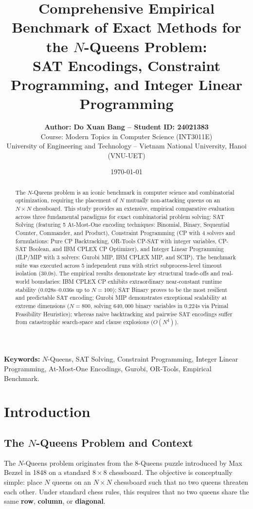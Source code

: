 \documentclass[a4paper,11pt]{article}
\title{\textbf{\LARGE Comprehensive Empirical Benchmark of Exact Methods for the $N$-Queens Problem: \\ SAT Encodings, Constraint Programming, and Integer Linear Programming}}
\author{
    \textbf{Author: Do Xuan Bang -- Student ID: 24021383}\\
    Course: Modern Topics in Computer Science (INT3011E) \\
    University of Engineering and Technology -- Vietnam National University, Hanoi (VNU-UET)
}
\date{\today}
\begin{document}
\maketitle

\begin{abstract}
\noindent The $N$-Queens problem is an iconic benchmark in computer science and combinatorial optimization, requiring the placement of $N$ mutually non-attacking queens on an $N \times N$ chessboard. This study provides an extensive, empirical comparative evaluation across three fundamental paradigms for exact combinatorial problem solving: SAT Solving (featuring 5 At-Most-One encoding techniques: Binomial, Binary, Sequential Counter, Commander, and Product), Constraint Programming (CP with 4 solvers and formulations: Pure CP Backtracking, OR-Tools CP-SAT with integer variables, CP-SAT Boolean, and IBM CPLEX CP Optimizer), and Integer Linear Programming (ILP/MIP with 3 solvers: Gurobi MIP, IBM CPLEX MIP, and SCIP). The benchmark suite was executed across 5 independent runs with strict subprocess-level timeout isolation (30.0s). The empirical results demonstrate key structural trade-offs and real-world boundaries: IBM CPLEX CP exhibits extraordinary near-constant runtime stability ($0.028$s--$0.036$s up to $N=100$); SAT Binary proves to be the most resilient and predictable SAT encoding; Gurobi MIP demonstrates exceptional scalability at extreme dimensions ($N=800$, solving $640,000$ binary variables in $0.224$s via Primal Feasibility Heuristics); whereas naive backtracking and pairwise SAT encodings suffer from catastrophic search-space and clause explosions ($O(N^4)$).
\end{abstract}

\vspace{0.5em}
\noindent\textbf{Keywords:} $N$-Queens, SAT Solving, Constraint Programming, Integer Linear Programming, At-Most-One Encodings, Gurobi, OR-Tools, Empirical Benchmark.

\vspace{1.5em}

\section{Introduction}

\subsection{The \texorpdfstring{$N$-Queens}{N-Queens} Problem and Context}
The $N$-Queens problem originates from the 8-Queens puzzle introduced by Max Bezzel in 1848 on a standard $8 \times 8$ chessboard. The objective is conceptually simple: place $N$ queens on an $N \times N$ chessboard such that no two queens threaten each other. Under standard chess rules, this requires that no two queens share the same \textbf{row}, \textbf{column}, or \textbf{diagonal}.
\end{document}
